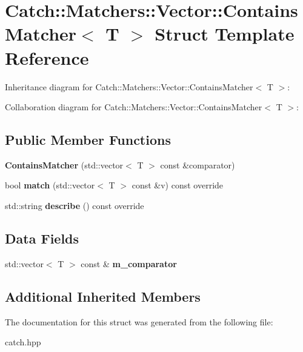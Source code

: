 \hypertarget{structCatch_1_1Matchers_1_1Vector_1_1ContainsMatcher}{}\section{Catch\+:\+:Matchers\+:\+:Vector\+:\+:Contains\+Matcher$<$ T $>$ Struct Template Reference}
\label{structCatch_1_1Matchers_1_1Vector_1_1ContainsMatcher}


Inheritance diagram for Catch\+:\+:Matchers\+:\+:Vector\+:\+:Contains\+Matcher$<$ T $>$\+:


Collaboration diagram for Catch\+:\+:Matchers\+:\+:Vector\+:\+:Contains\+Matcher$<$ T $>$\+:
\subsection*{Public Member Functions}
\begin{DoxyCompactItemize}
\item 
\mbox{\label{structCatch_1_1Matchers_1_1Vector_1_1ContainsMatcher_ad8e92c8399be6dce75bb5702cdfab700}} 
{\bfseries Contains\+Matcher} (std\+::vector$<$ T $>$ const \&comparator)
\item 
\mbox{\label{structCatch_1_1Matchers_1_1Vector_1_1ContainsMatcher_afd33467ae48a41a634572b41b053f67f}} 
bool {\bfseries match} (std\+::vector$<$ T $>$ const \&v) const override
\item 
\mbox{\label{structCatch_1_1Matchers_1_1Vector_1_1ContainsMatcher_abe6a9ea3d6506c9a1f75ff524f35832e}} 
std\+::string {\bfseries describe} () const override
\end{DoxyCompactItemize}
\subsection*{Data Fields}
\begin{DoxyCompactItemize}
\item 
\mbox{\label{structCatch_1_1Matchers_1_1Vector_1_1ContainsMatcher_a83d051166e4ed0d535219ad6ee99abb2}} 
std\+::vector$<$ T $>$ const  \& {\bfseries m\+\_\+comparator}
\end{DoxyCompactItemize}
\subsection*{Additional Inherited Members}


The documentation for this struct was generated from the following file\+:\begin{DoxyCompactItemize}
\item 
catch.\+hpp\end{DoxyCompactItemize}
